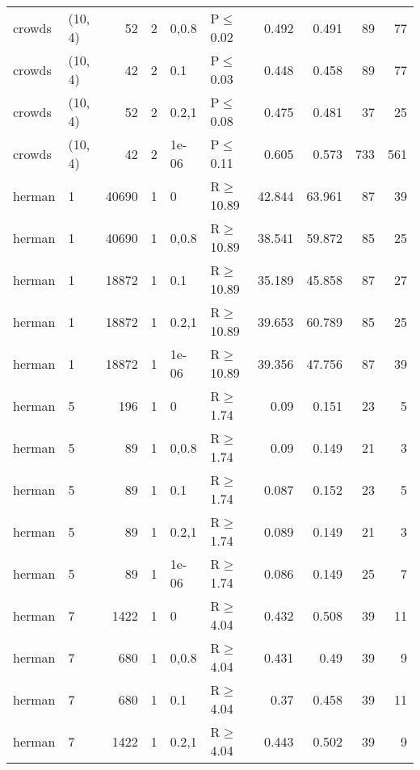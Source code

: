 \begin{longtable}{llrrllrrrr}
 crowds        & (10, 4)  &     	52 &   2 & 0,0.8 & P$\leq$0.02  & 0.492   & 0.491   & 89      & 77   \\
 crowds        & (10, 4)  &     	42 &   2 & 0.1   & P$\leq$0.03  & 0.448   & 0.458   & 89      & 77   \\
 crowds        & (10, 4)  &     	52 &   2 & 0.2,1 & P$\leq$0.08  & 0.475   & 0.481   & 37      & 25   \\
 crowds        & (10, 4)  &     	42 &   2 & 1e-06 & P$\leq$0.11  & 0.605   & 0.573   & 733     & 561  \\
 herman        & 1        &  	40690 &   1 & 0     & R$\geq$10.89 & 42.844  & 63.961  & 87      & 39   \\
 herman        & 1        &  	40690 &   1 & 0,0.8 & R$\geq$10.89 & 38.541  & 59.872  & 85      & 25   \\
 herman        & 1        &  	18872 &   1 & 0.1   & R$\geq$10.89 & 35.189  & 45.858  & 87      & 27   \\
 herman        & 1        &  	18872 &   1 & 0.2,1 & R$\geq$10.89 & 39.653  & 60.789  & 85      & 25   \\
 herman        & 1        &  	18872 &   1 & 1e-06 & R$\geq$10.89 & 39.356  & 47.756  & 87      & 39   \\
 herman        & 5        &    	196 &   1 & 0     & R$\geq$1.74  & 0.09    & 0.151   & 23      & 5    \\
 herman        & 5        &     	89 &   1 & 0,0.8 & R$\geq$1.74  & 0.09    & 0.149   & 21      & 3    \\
 herman        & 5        &     	89 &   1 & 0.1   & R$\geq$1.74  & 0.087   & 0.152   & 23      & 5    \\
 herman        & 5        &     	89 &   1 & 0.2,1 & R$\geq$1.74  & 0.089   & 0.149   & 21      & 3    \\
 herman        & 5        &     	89 &   1 & 1e-06 & R$\geq$1.74  & 0.086   & 0.149   & 25      & 7    \\
 herman        & 7        &   	1422 &   1 & 0     & R$\geq$4.04  & 0.432   & 0.508   & 39      & 11   \\
 herman        & 7        &    	680 &   1 & 0,0.8 & R$\geq$4.04  & 0.431   & 0.49    & 39      & 9    \\
 herman        & 7        &    	680 &   1 & 0.1   & R$\geq$4.04  & 0.37    & 0.458   & 39      & 11   \\
 herman        & 7        &   	1422 &   1 & 0.2,1 & R$\geq$4.04  & 0.443   & 0.502   & 39      & 9    \\

\end{longtable}

